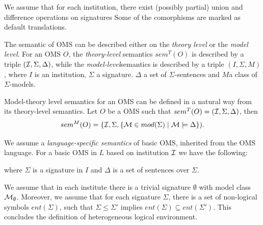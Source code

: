 \documentclass[10pt,%
\ifpretendfinal
final%
\else
draft%
\fi,
]{scrreprt}
\newcommand*{\syntax}[1]{\texttt{#1}}
\newcommand{\semdom}[1]{
\begin{center}
\fbox{$#1$}
\end{center}
}
\begin{document}
{\color{blue}
We assume that for each institution, there exist (possibly partial) union and difference operations on signatures  
Some of the comorphisms are marked as default translations.
}
%

The semantic of OMS can be described either on the \emph{theory level} or the \emph{model level}. For an OMS $O$, the \emph{theory-level} semantics $sem^T(O)$ is described by a triple $({\cal I},\Sigma, \Delta)$, while the \emph{model-level}semantics is described by a triple $(I, \Sigma, M)$, where $I$ is an institution, $\Sigma$ a signature.  $\Delta$ a set of $\Sigma$-sentences and $M$a class of $\Sigma$-models.  

Model-theory level semantics for an OMS can be defined in a natural way from its theory-level semantics. Let $O$ be a OMS such that $sem^T(O)=({\cal I}, \Sigma, \Delta)$, then $$sem^M(O)= \{{\cal I}, \Sigma, \{ {\cal M} \in mod(\Sigma) \mid {\cal M} \models \Delta \}).$$

We  assume a \emph{language-specific semantics} of basic
OMS, inherited from the OMS language.  
For a basic OMS in $L$ based on institution ${\mathcal{I}}$ we have the following:
\semdom{sem_L(\syntax{BasicOMS})=(I, \Sigma,\Delta)}
%  
where  $\Sigma$ is a signature in $I$ and $\Delta$ is a set
of sentences over $\Sigma$. 

%

We assume that in each institute there is a trivial signature
$\emptyset$ with model class ${\cal M}_\emptyset$. Moreover, we assume that
for each signature $\Sigma$, there is a set of non-logical symbols $ent(\Sigma)$,
such that $\Sigma\leq\Sigma'$ implies $ent(\Sigma)\subseteq
ent(\Sigma')$.
This concludes the definition of heterogeneous logical environment.
\end{document}
